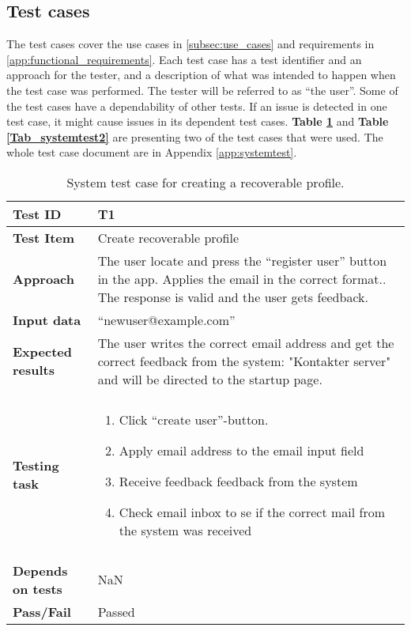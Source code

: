 \subsection{Test cases}
The test cases cover the use cases in \ref{subsec:use_cases} and requirements in \ref{app:functional_requirements}. 
Each test case has a test identifier and an approach for the tester, and a description of what was intended to happen when the test case was performed. The tester will be referred to as “the user”. 
Some of the test cases have a dependability of other tests. If an issue is detected in one test case, it might cause issues in its dependent test cases. \textbf{Table \ref{Tab:systemtest1}} and \textbf{Table \ref{Tab_systemtest2}} are presenting two of the test cases that were used. The whole test case document are in Appendix \ref{app:systemtest}. 

\begin{table}[H]
	\centering
	\caption{System test case for creating a recoverable profile.}
	\begin{tabular}[b]{ | l | l  |}
		\hline
		\textbf{Test ID} & T1  \\ \hline
		\textbf{Test Item} & Create recoverable profile \\ \hline
		\textbf{Approach} & \begin{minipage}{5in}The user locate and press the “register user” button in the app. Applies the email in the correct format.. The response is valid and the user gets feedback. \end{minipage}\\ \hline
		\textbf{Input data} &  “newuser@example.com”\\ \hline
		
		\textbf{Expected results} & \begin{minipage}{5in}The user writes the correct email address and get the correct feedback from the system: "Kontakter server" and will be directed to the startup page.\end{minipage}\\ \hline&\\[-3.8ex]
		
		\textbf{Testing task} & \begin{minipage}{5in}
			\begin{enumerate}[noitemsep]
				\item Click  “create user”-button.
				\item Apply email address to the email input field 
				\item Receive feedback feedback from the system
				\item Check email inbox to se if the correct mail from the system was received 
			\end{enumerate} \end{minipage}
			\\&\\[-3.8ex] \hline
			\textbf{Depends on tests}& NaN \\ \hline	
			\textbf{Pass/Fail} & Passed \\\hline				
		\end{tabular}
		\label{Tab:systemtest1}
	\end{table}
	
